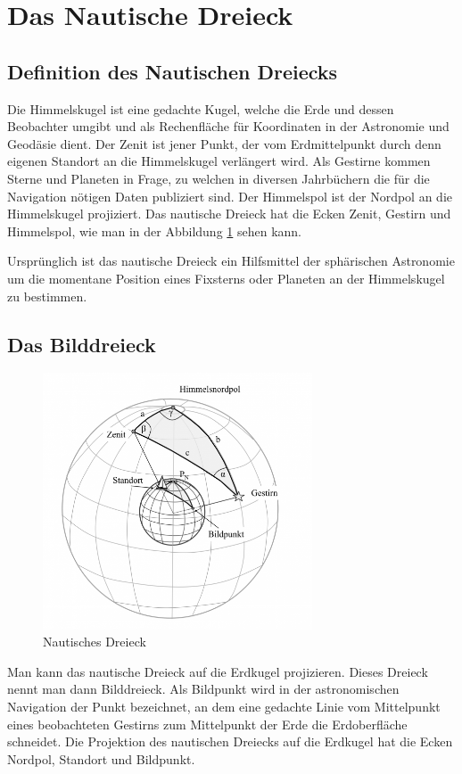 \section{Das Nautische Dreieck}
\subsection{Definition des Nautischen Dreiecks}
Die Himmelskugel ist eine gedachte Kugel, welche die Erde und dessen Beobachter umgibt und als Rechenfläche für Koordinaten in der Astronomie und Geodäsie dient.
Der Zenit ist jener Punkt, der vom Erdmittelpunkt durch denn eigenen Standort an die Himmelskugel verlängert wird.
Als Gestirne kommen Sterne und Planeten in Frage, zu welchen in diversen Jahrbüchern die für die Navigation nötigen Daten publiziert sind.
Der Himmelspol ist der Nordpol an die Himmelskugel projiziert.
Das nautische Dreieck hat die Ecken Zenit, Gestirn und Himmelspol, wie man in der Abbildung \ref{naut} sehen kann.

Ursprünglich ist das nautische Dreieck ein Hilfsmittel der sphärischen Astronomie um die momentane Position eines Fixsterns oder Planeten an der Himmelskugel zu bestimmen. 

\subsection{Das Bilddreieck}
\begin{figure}
	\begin{center}
		\includegraphics[width=8cm]{papers/nav/bilder/kugel3.png}
		\caption[Nautisches Dreieck]{Nautisches Dreieck}
		\label{naut}
	\end{center}
\end{figure}
 Man kann das nautische Dreieck auf die Erdkugel projizieren.
Dieses Dreieck nennt man dann Bilddreieck. 
Als Bildpunkt wird in der astronomischen Navigation der Punkt bezeichnet, an dem eine gedachte Linie vom Mittelpunkt eines beobachteten Gestirns zum Mittelpunkt der Erde die Erdoberfläche schneidet. 
Die Projektion des nautischen Dreiecks auf die Erdkugel hat die Ecken Nordpol, Standort und Bildpunkt.

